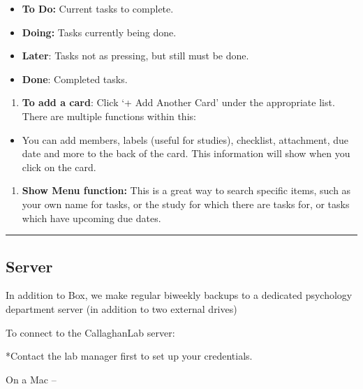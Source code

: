 \documentclass[
]{book}
\providecommand{\tightlist}{%
  \setlength{\itemsep}{0pt}\setlength{\parskip}{0pt}}
\begin{document}
\begin{itemize}
\tightlist
\item
  \textbf{To Do:} Current tasks to complete.
\item
  \textbf{Doing:} Tasks currently being done.
\item
  \textbf{Later}: Tasks not as pressing, but still must be done.
\item
  \textbf{Done}: Completed tasks.
\end{itemize}

\begin{enumerate}
\def\labelenumi{\arabic{enumi}.}
\setcounter{enumi}{1}
\tightlist
\item
  \textbf{To add a card}: Click `+ Add Another Card' under the appropriate list. There are multiple functions within this:
\end{enumerate}

\begin{itemize}
\tightlist
\item
  You can add members, labels (useful for studies), checklist, attachment, due date and more to the back of the card. This information will show when you click on the card.
\end{itemize}

\begin{enumerate}
\def\labelenumi{\arabic{enumi}.}
\setcounter{enumi}{2}
\tightlist
\item
  \textbf{Show Menu function:} This is a great way to search specific items, such as your own name for tasks, or the study for which there are tasks for, or tasks which have upcoming due dates.
\end{enumerate}

\begin{center}\rule{0.5\linewidth}{0.5pt}\end{center}

\hypertarget{server}{%
\subsection{Server}\label{server}}

In addition to Box, we make regular biweekly backups to a dedicated psychology department server (in addition to two external drives)

To connect to the CallaghanLab server:

*Contact the lab manager first to set up your credentials.

On a Mac --
\end{document}
